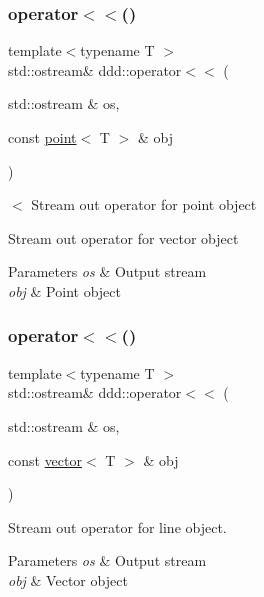 \subsubsection{\texorpdfstring{operator$<$$<$()}{operator<<()}\hspace{0.1cm}{\footnotesize\ttfamily [1/10]}}
{\footnotesize\ttfamily template$<$typename T $>$ \\
std\+::ostream\& ddd\+::operator$<$$<$ (\begin{DoxyParamCaption}\item[{std\+::ostream \&}]{os,  }\item[{const \hyperlink{classddd_1_1point}{point}$<$ T $>$ \&}]{obj }\end{DoxyParamCaption})\hspace{0.3cm}{\ttfamily [inline]}}



$<$ Stream out operator for point object 

Stream out operator for vector object 
\begin{DoxyParams}{Parameters}
{\em os} & Output stream \\
\hline
{\em obj} & Point object \\
\hline
\end{DoxyParams}
\mbox{\label{namespaceddd_a85783ffbd6985b1981059732d7bbe174}} 
\subsubsection{\texorpdfstring{operator$<$$<$()}{operator<<()}\hspace{0.1cm}{\footnotesize\ttfamily [2/10]}}
{\footnotesize\ttfamily template$<$typename T $>$ \\
std\+::ostream\& ddd\+::operator$<$$<$ (\begin{DoxyParamCaption}\item[{std\+::ostream \&}]{os,  }\item[{const \hyperlink{classddd_1_1vector}{vector}$<$ T $>$ \&}]{obj }\end{DoxyParamCaption})\hspace{0.3cm}{\ttfamily [inline]}}



Stream out operator for line object. 


\begin{DoxyParams}{Parameters}
{\em os} & Output stream \\
\hline
{\em obj} & Vector object \\
\hline
\end{DoxyParams}
\mbox{\label{namespaceddd_a2001eec5d960802592e1ca6a5b0dc203}} 
